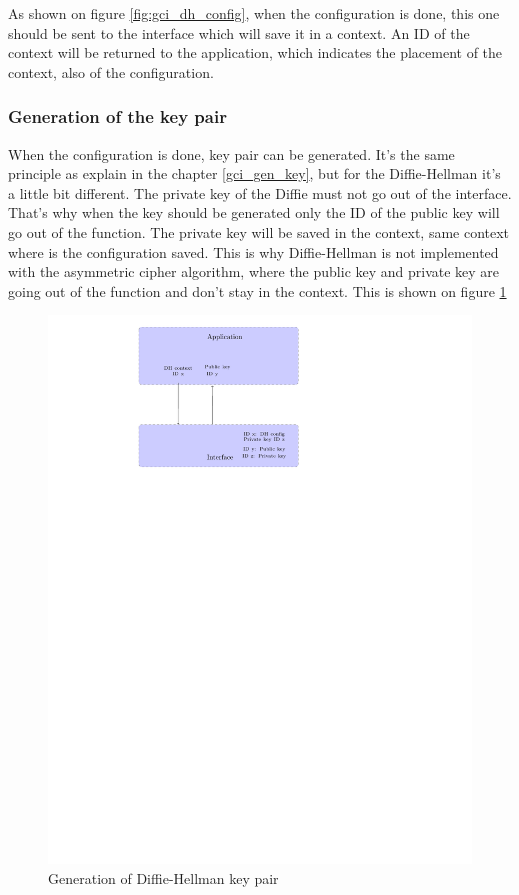 As shown on figure \ref{fig:gci_dh_config}, when the configuration is done, this
one should be sent to the interface which will save it in a context.
An ID of the context will be returned to the application, which indicates the
placement of the context, also of the configuration.


\subsubsection*{Generation of the key pair}

When the configuration is done, key pair can be generated. It's the same
principle as explain in the chapter \ref{gci_gen_key}, but for the
Diffie-Hellman it's a little bit different. The private key of the Diffie must not go out of the
interface. That's why when the key should be generated only the ID of the public
key will go out of the function. The private key will be saved in the
context, same context where is the configuration saved. This is why
Diffie-Hellman is not implemented with the asymmetric cipher algorithm, where the public key and private key are going out of the function and don't stay in
the context. This is shown on figure \ref{fig:gci_dh_gen_key}

\begin{figure}[!ht]
\centering
\includegraphics[trim=8.5cm 20cm 13cm 0cm]{figures/gci_dh_gen_key.pdf}
\caption{Generation of Diffie-Hellman key pair}
\label{fig:gci_dh_gen_key}
\end{figure}



